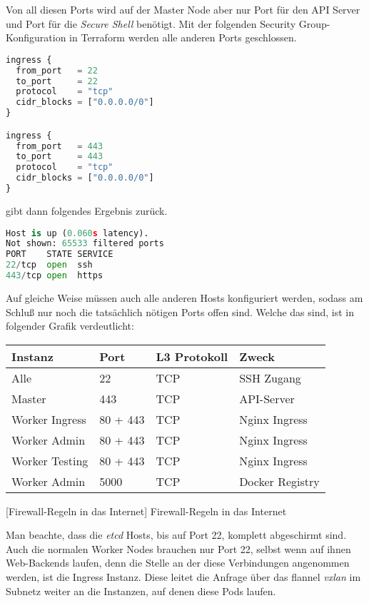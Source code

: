Von all diesen Ports wird auf der Master Node aber nur Port  für
den API Server und Port  für die \emph{Secure Shell} benötigt. Mit der folgenden
Security Group-Konfiguration in Terraform werden alle anderen Ports geschlossen.

\begin{lstlisting}[language=Python,numbers=none]
ingress {
  from_port   = 22
  to_port     = 22
  protocol    = "tcp"
  cidr_blocks = ["0.0.0.0/0"]
}

ingress {
  from_port   = 443
  to_port     = 443
  protocol    = "tcp"
  cidr_blocks = ["0.0.0.0/0"]
}\end{lstlisting}

 gibt dann folgendes Ergebnis zurück.

\begin{lstlisting}[language=Python,numbers=none]
Host is up (0.060s latency).
Not shown: 65533 filtered ports
PORT    STATE SERVICE
22/tcp  open  ssh
443/tcp open  https\end{lstlisting}

Auf gleiche Weise müssen auch alle anderen Hosts konfiguriert werden, sodass
am Schluß nur noch die tats\"achlich n\"otigen Ports offen sind.
Welche das sind, ist in folgender Grafik verdeutlicht:

\begin{flushleft}
\centering
\begin{tabular}{ | l | l | l | l | }
  \hline
  Instanz & Port & L3 Protokoll & Zweck \\ \hline \hline
  Alle & 22 & TCP & SSH Zugang \\ \hline
  Master & 443 & TCP & API-Server  \\ \hline
  Worker Ingress & 80 + 443 & TCP & Nginx Ingress \\ \hline
  Worker Admin & 80 + 443 & TCP & Nginx Ingress \\ \hline
  Worker Testing & 80 + 443 & TCP & Nginx Ingress \\ \hline
  Worker Admin & 5000 & TCP & Docker Registry \\ \hline
\end{tabular}
    [Firewall-Regeln in das Internet]
    {Firewall-Regeln in das Internet}
\end{flushleft}

Man beachte, dass die \emph{etcd} Hosts, bis auf Port 22, komplett abgeschirmt sind.
Auch die normalen Worker Nodes brauchen nur Port 22, selbst wenn auf ihnen
Web-Backends laufen, denn die
Stelle an der diese Verbindungen angenommen werden, ist die Ingress Instanz.
Diese leitet die Anfrage über das flannel \emph{vxlan} im Subnetz
weiter an die Instanzen, auf denen diese Pods laufen.

